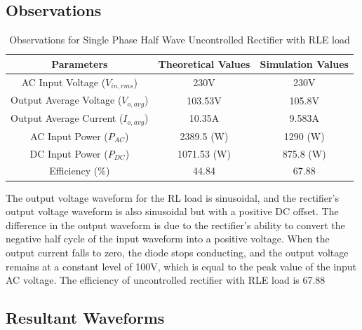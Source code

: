 \subsection{Observations}

\begin{table}[h]
    \renewcommand{\arraystretch}{1.3}

    \label{table_observation_4}
    \centering
    \begin{tabular}{|c|c|c|}
        \hline
        Parameters                              & Theoretical Values & Simulation Values \\
        \hline
        \hline
        AC Input Voltage ($ V_{in,rms} $)       & 230V               & 230V              \\
        \hline
        Output Average Voltage ($ V_{o,avg} $)  & 103.53V            & 105.8V            \\
        \hline
        Output Average Current ($ I_{o,avg}  $) & 10.35A             & 9.583A            \\
        \hline
        AC Input Power ($ P_{AC}  $)            & 2389.5 (W)         & 1290 (W)          \\
        \hline
        DC Input Power ($ P_{DC}  $)            & 1071.53 (W)        & 875.8 (W)         \\
        \hline
        Efficiency (\%)                         & 44.84              & 67.88             \\
        \hline
    \end{tabular}
    \caption{Observations for Single Phase Half Wave Uncontrolled Rectifier with RLE load}
\end{table}


The output voltage waveform for the RL load is sinusoidal, and the rectifier's output voltage waveform is also sinusoidal but with a positive DC offset. The difference in the output waveform is due to the rectifier's ability to convert the negative half cycle of the input waveform into a positive voltage. When the output current falls to zero, the diode stops conducting, and the output voltage remains at a constant level of 100V, which is equal to the peak value of the input AC voltage.
The efficiency of uncontrolled rectifier with RLE load is 67.88%

\pagebreak

\subsection{Resultant Waveforms}

